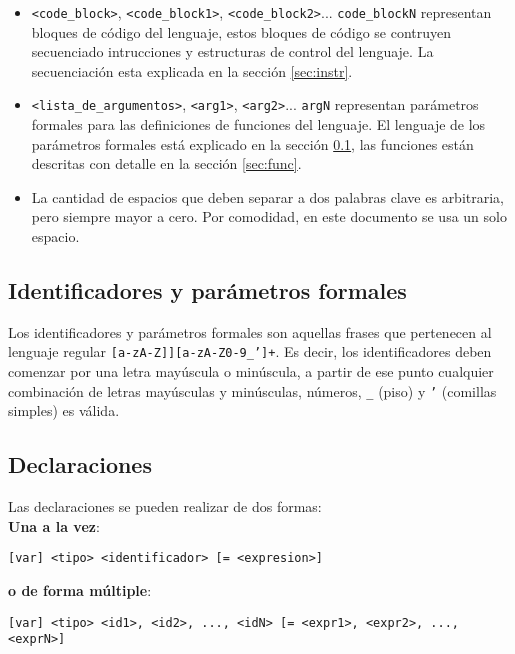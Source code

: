\documentclass[12pt, spanish]{report}
\begin{document}
\begin{itemize}
 \item \texttt{<code\_block>}, \texttt{<code\_block1>}, \texttt{<code\_block2>}...
       \texttt{code\_blockN} representan bloques de c\'odigo del lenguaje,
       estos bloques de c\'odigo se contruyen secuenciado intrucciones y
       estructuras de control del lenguaje. La secuenciaci\'on esta 
       explicada en la secci\'on \ref{sec:instr}.
       
 \item \texttt{<lista\_de\_argumentos>}, \texttt{<arg1>}, \texttt{<arg2>}...
       \texttt{argN} representan par\'ametros formales para las definiciones de
       funciones del lenguaje. El lenguaje de los par\'ametros formales
       est\'a explicado en la secci\'on \ref{sec:ident}, las funciones
       est\'an descritas con detalle en la secci\'on \ref{sec:func}.
       
 \item La cantidad de espacios que deben separar a dos palabras clave es
       arbitraria, pero siempre mayor a cero. Por comodidad, en este
       documento se usa un solo espacio.
\end{itemize}

\subsection{Identificadores y par\'ametros formales}
\label{sec:ident}
Los identificadores y par\'ametros formales son aquellas frases que pertenecen al lenguaje
regular \texttt{[a-zA-Z]][a-zA-Z0-9\_']+}. Es decir, los identificadores
deben comenzar por una letra may\'uscula o min\'uscula, a partir de ese punto cualquier
combinaci\'on de letras may\'usculas y min\'usculas, n\'umeros,
\texttt{\_} (piso) y \texttt{'} (comillas simples) es v\'alida. 

\subsection{Declaraciones}
\label{sec:decl}

Las declaraciones se pueden realizar de dos formas:\\

\textbf{Una a la vez}:
\begin{verbatim}
[var] <tipo> <identificador> [= <expresion>]
\end{verbatim}

\textbf{o de forma m\'ultiple}:
\begin{verbatim}
[var] <tipo> <id1>, <id2>, ..., <idN> [= <expr1>, <expr2>, ..., <exprN>]
\end{verbatim}
\end{document}
